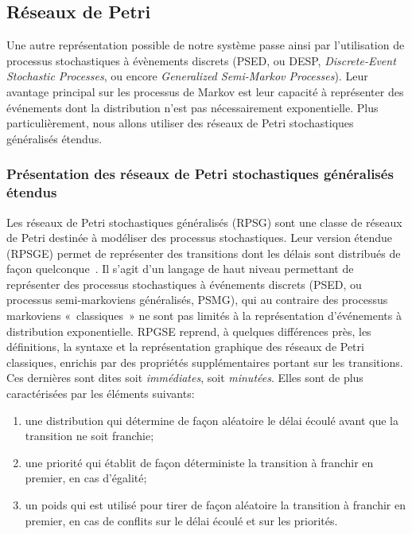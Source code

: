     \subsection{Réseaux de Petri}
Une autre représentation possible de notre système passe ainsi par l'utilisation de processus stochastiques à évènements discrets (PSED, ou DESP, \textit{Discrete-Event Stochastic Processes}, ou encore \textit{Generalized Semi-Markov Processes}).
Leur avantage principal sur les processus de Markov est leur capacité à représenter des événements dont la distribution n'est pas nécessairement exponentielle.
Plus particulièrement, nous allons utiliser des réseaux de Petri stochastiques généralisés étendus.

        \subsubsection{Présentation des réseaux de Petri stochastiques généralisés étendus}
\label{sa:subsubsec:presRPSGE}
Les réseaux de Petri stochastiques généralisés (RPSG) sont une classe de réseaux de Petri destinée à modéliser des processus stochastiques.
Leur version étendue (RPSGE) permet de représenter des transitions dont les délais sont distribués de façon quelconque~\cite{ABCDF95}.
Il s'agit d'un langage de haut niveau permettant de représenter des processus stochastiques à événements discrets (PSED, ou processus semi-markoviens généralisés, PSMG), qui au contraire des processus markoviens «~classiques~» ne sont pas limités à la représentation d'événements à distribution exponentielle.
RPGSE reprend, à quelques différences près, les définitions, la syntaxe et la représentation graphique des réseaux de Petri classiques, enrichis par des propriétés supplémentaires portant sur les transitions.
Ces dernières sont dites soit \textit{immédiates}, soit \textit{minutées}.
Elles sont de plus caractérisées par les éléments suivants:
\begin{enumerate}
    \item une distribution qui détermine de façon aléatoire le délai écoulé avant que la transition ne soit franchie;
    \item une priorité qui établit de façon déterministe la transition à franchir en premier, en cas d'égalité;
    \item un poids qui est utilisé pour tirer de façon aléatoire la transition à franchir en premier, en cas de conflits sur le délai écoulé et sur les priorités.
\end{enumerate}

